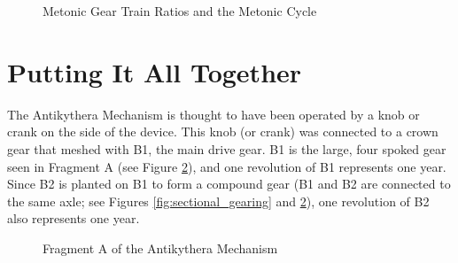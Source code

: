 \documentclass[11pt, oneside]{article}   	%
\theoremstyle{definition}
\begin{document}
\bigskip
\begin{figure}[H]
\caption{Metonic Gear Train Ratios and the Metonic Cycle}
\label{fig:metonic_gear_ratios}
\end{figure}


\bigskip
\section{Putting It All Together}
The Antikythera Mechanism is thought to have been operated by a knob or crank on the side of the device. This knob (or crank) was connected
to a crown gear that meshed with B1, the main drive gear. B1 is the large, four spoked gear seen in Fragment A (see Figure \ref{fig:fragmentA}), 
and one revolution of B1 represents one year. Since B2 is planted on B1 to form a compound gear (B1 and B2 are connected to the same axle;
see Figures  \ref{fig:sectional_gearing} and \ref{fig:fragmentA}), one revolution of B2 also represents one year. 


\bigskip
\begin{figure}[H]
\caption{Fragment A of the Antikythera Mechanism \cite{wiki:fragmentA}}
\label{fig:fragmentA}
\end{figure}
\end{document}
